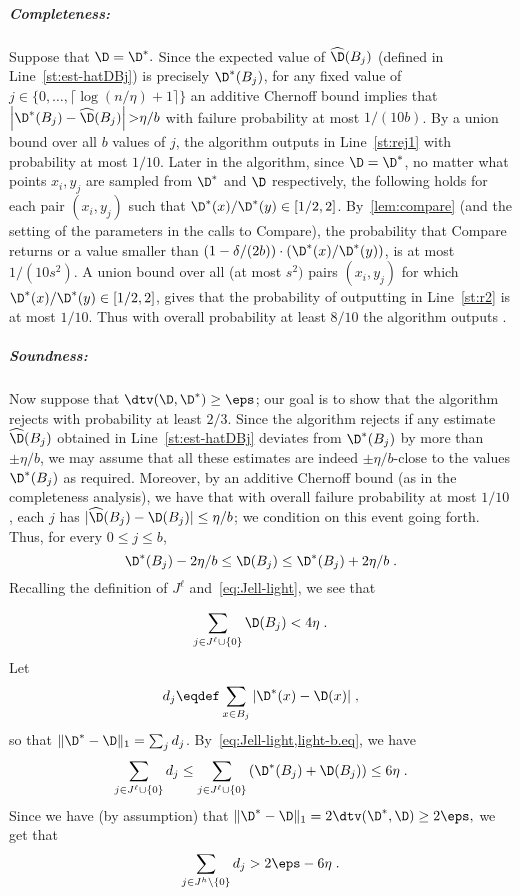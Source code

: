 \subparagraph{Completeness:}  Suppose that $\D = \D^\ast.$
Since the expected value of $\widehat{\D}(B_j)$
(defined in Line~\ref{st:est-hatDBj}) is precisely
$\D^\ast(B_j)$, for any fixed value of
$j \in \{0,\dots,\lceil \log(n/\eta)+1\rceil\}$ an additive Chernoff
bound implies that $\left|\D^\ast(B_j) - \widehat{\D}(B_j)\right| {>} \eta/b$
with failure probability at most $1/(10b)$.
By a union bound over all $b$ values of $j$, the algorithm outputs
\reject in Line~\ref{st:rej1} with probability at most $1/10$.
Later in the algorithm,
since $\D = \D^\ast$, no matter what points $x_i,y_j$
are sampled from $\D^\ast$ and $\D$ respectively,
{the following holds for each pair $(x_i,y_j)$
such that $\D^\ast(x)/\D^\ast(y) \in [1/2,2]$.
By~\cref{lem:compare} (and the setting of the parameters
in the calls to {\sc Compare}), the probability that {\sc Compare}
returns \low or a value smaller than
$(1-\delta/(2b))\cdot (\D^\ast(x)/\D^\ast(y))$, is at most
$1/(10s^2)$.}
A union bound over all (at most $s^2)$ pairs $(x_i,y_j)$
{for which $\D^\ast(x)/\D^\ast(y) \in [1/2,2]$},
gives that the probability
of outputting \reject in Line~\ref{st:r2} is at most $1/10$.
Thus with overall probability
at least $8/10$ the algorithm outputs \accept.



\bigskip

\subparagraph{Soundness:}  Now suppose that $\dtv(\D,\D^\ast) \geq \eps$; our goal is to
show that the algorithm rejects with probability at least $2/3.$
Since the algorithm rejects if any estimate
$\widehat{\D}(B_j)$ obtained in Line~\ref{st:est-hatDBj} deviates from $\D^\ast(B_j)$ by
more than $\pm \eta/b$, we may assume that all these estimates are indeed $\pm \eta/b$-close
to the values $\D^\ast(B_j)$ as required.
Moreover, by an additive Chernoff bound (as in the completeness analysis), we have that
with overall failure probability at most $1/10$, each $j$ has
$|\widehat{\D}(B_j) - \D(B_j)| \leq \eta/b$; we condition on this event going forth.
Thus, for every $0 \leq j \leq b$,
\begin{equation}
\D^\ast(B_j) - 2\eta/b \leq \D(B_j) \leq \D^\ast(B_j) + 2\eta/b\;.
\label{est-b.eq}
\end{equation}
Recalling the definition of $J^\ell$ and~\cref{eq:Jell-light}, we see that

\begin{equation}
\sum_{j\in J^\ell \cup \{0\}}\D(B_j) < 4\eta\;.
\label{light-b.eq}
\end{equation}
Let
\begin{equation}
d_j \eqdef \sum_{x\in B_j} |\D^\ast(x) - \D(x)|\;,
\end{equation}
so that $\|\D^\ast - \D\|_1 = \sum_j d_j$.
By~\cref{eq:Jell-light,light-b.eq}, we have
\begin{equation}
\sum_{j\in J^\ell\cup\{0\}} d_j \leq
\sum_{j\in J^\ell\cup\{0\}} \left(\D^\ast(B_j) + \D(B_j)\right)
\leq 6\eta\;.
\end{equation}
Since we have (by assumption) that $\|\D^\ast - \D\|_1 = 2 \dtv(\D^\ast,\D) \geq 2\eps,$
we get that
\begin{equation}
\sum_{j \in J^h\setminus \{0\}} d_j > 2\eps-6\eta\;.
\label{sum-high.eq}
\end{equation}


